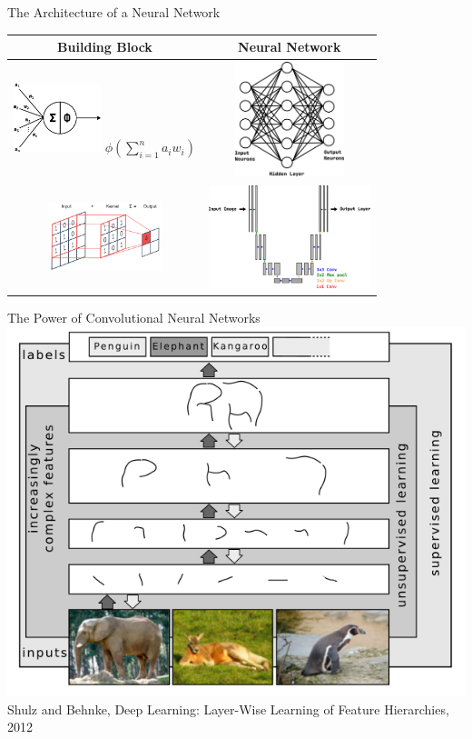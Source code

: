 \begin{frame}{The Architecture of a Neural Network}
   \centering
   \renewcommand{\arraystretch}{1.5}
   \begin{tabular}{c|c}
      \Large{Building Block} & \Large{Neural Network} \\ \hline \pause
      {\includegraphics[width=1in, valign=m,margin = 1pt]{images/neuron.png} $\phi(\sum_{i=1}^n a_i w_i)$} & \includegraphics[width=1.25in, valign=m, margin = 1pt]{images/fcn.png} \\ \hline \pause 
      \includegraphics[width = 1.3in, valign=m, margin = 1pt]{images/2d-convolution.png} & \includegraphics[width=1.85in, valign=m, margin = 1pt]{images/u-net.png}
   \end{tabular}
\end{frame}

\begin{frame}{The Power of Convolutional Neural Networks}
   \centering
   \includegraphics[width=0.6\linewidth]{images/conv-layers.png}\\
   \tiny{Shulz and Behnke, Deep Learning: Layer-Wise Learning of Feature Hierarchies, 2012}
\end{frame}

